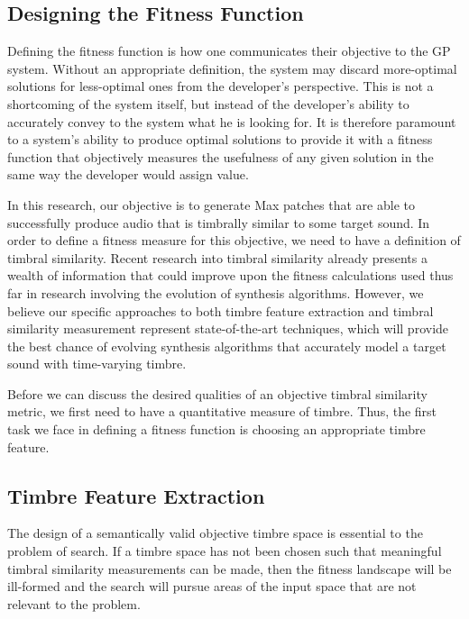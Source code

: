 \documentclass[12pt]{report} 	%
\numberwithin{figure}{chapter}
\numberwithin{table}{chapter}
\numberwithin{equation}{chapter}
\begin{document}
\begin{flushleft}
\section{Designing the Fitness Function}

Defining the fitness function is how one communicates their objective to the GP system. Without an appropriate definition, the system may discard more-optimal solutions for less-optimal ones from the developer's perspective. This is not a shortcoming of the system itself, but instead of the developer's ability to accurately convey to the system what he is looking for. It is therefore paramount to a system's ability to produce optimal solutions to provide it with a fitness function that objectively measures the usefulness of any given solution in the same way the developer would assign value.

In this research, our objective is to generate Max patches that are able to successfully produce audio that is timbrally similar to some target sound. In order to define a fitness measure for this objective, we need to have a definition of timbral similarity. Recent research into timbral similarity already presents a wealth of information that could improve upon the fitness calculations used thus far in research involving the evolution of synthesis algorithms. However, we believe our specific approaches to both timbre feature extraction and timbral similarity measurement represent state-of-the-art techniques, which will provide the best chance of evolving synthesis algorithms that accurately model a target sound with time-varying timbre.

Before we can discuss the desired qualities of an objective timbral similarity metric, we first need to have a quantitative measure of timbre. Thus, the first task we face in defining a fitness function is choosing an appropriate timbre feature.

\subsection{Timbre Feature Extraction}

The design of a semantically valid objective timbre space is essential to the problem of search. If a timbre space has not been chosen such that meaningful timbral similarity measurements can be made, then the fitness landscape will be ill-formed and the search will pursue areas of the input space that are not relevant to the problem.


\end{flushleft}
\end{document}
